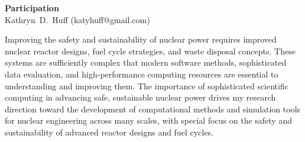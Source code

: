 \documentclass[a4paper, 12pt]{article}
\makeatletter
\newcommand{\authorname}{Kathryn~D.~Huff }
\newcommand{\authoremail}{katyhuff@gmail.com}
\newcommand{\authorsite}{katyhuff.github.com}
\makeatother
\begin{document}
\pagestyle{fancy}
\lhead{\textcolor{gray}{\it \authorname}}
\rhead{\textcolor{gray}{\thepage/\totalpages{}}}
\renewcommand{\headrulewidth}{0pt} 
\renewcommand{\footrulewidth}{0pt} 
\fancyfoot[C]{\footnotesize \textcolor{gray}{\authorsite}} 

\begin{center}
{\LARGE \bf Participation}\\
\vspace*{0.1cm}
{\normalsize \authorname (\authoremail)}
\end{center}




Improving the safety and sustainability of nuclear power requires improved
nuclear reactor designs, fuel cycle strategies, and waste disposal concepts.
These systems are sufficiently complex that modern software methods,
sophisticated data evaluation, and high-performance computing resources are
essential to understanding and improving them. The importance of sophisticated
scientific computing in advancing safe, sustainable nuclear power drives my
research direction toward the development of computational methods and
simulation tools for nuclear engineering across many scales, with special focus
on the safety and sustainability of advanced reactor designs and fuel cycles.
\end{document}
